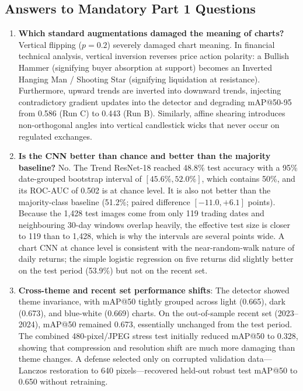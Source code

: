 \documentclass[10pt,journal]{IEEEtran}
\begin{document}
\subsection{Answers to Mandatory Part 1 Questions}
\begin{enumerate}
  \item \textbf{Which standard augmentations damaged the meaning of charts?}
  Vertical flipping ($p=0.2$) severely damaged chart meaning. In financial technical analysis, vertical inversion reverses price action polarity: a Bullish Hammer (signifying buyer absorption at support) becomes an Inverted Hanging Man / Shooting Star (signifying liquidation at resistance). Furthermore, upward trends are inverted into downward trends, injecting contradictory gradient updates into the detector and degrading mAP@50-95 from 0.586 (Run C) to 0.443 (Run B). Similarly, affine shearing introduces non-orthogonal angles into vertical candlestick wicks that never occur on regulated exchanges.
  
  \item \textbf{Is the CNN better than chance and better than the majority baseline?}
  No. The Trend ResNet-18 reached 48.8\% test accuracy with a 95\% date-grouped bootstrap interval of $[45.6\%, 52.0\%]$, which contains 50\%, and its ROC-AUC of 0.502 is at chance level. It is also not better than the majority-class baseline (51.2\%; paired difference $[-11.0, +6.1]$ points). Because the 1,428 test images come from only 119 trading dates and neighbouring 30-day windows overlap heavily, the effective test size is closer to 119 than to 1,428, which is why the intervals are several points wide. A chart CNN at chance level is consistent with the near-random-walk nature of daily returns; the simple logistic regression on five returns did slightly better on the test period (53.9\%) but not on the recent set.
  
  \item \textbf{Cross-theme and recent set performance shifts}:
  The detector showed theme invariance, with mAP@50 tightly grouped across light (0.665), dark (0.673), and blue-white (0.669) charts. On the out-of-sample recent set (2023--2024), mAP@50 remained 0.673, essentially unchanged from the test period. The combined 480-pixel/JPEG stress test initially reduced mAP@50 to 0.328, showing that compression and resolution shift are much more damaging than theme changes. A defense selected only on corrupted validation data---Lanczos restoration to 640 pixels---recovered held-out robust test mAP@50 to 0.650 without retraining.
  

\end{enumerate}
\end{document}
